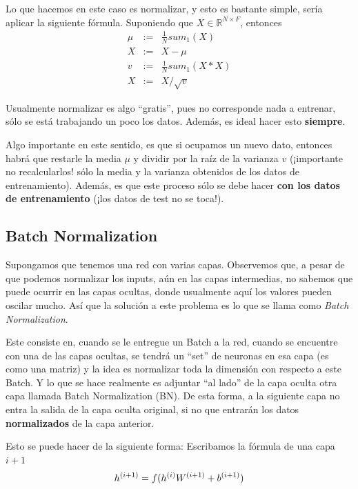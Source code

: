 Lo que hacemos en este caso es normalizar, y esto es bastante simple, sería aplicar la siguiente fórmula. Suponiendo que $X \in \mathbb{R}^{N \times F}$, entonces
\begin{eqnarray*}
    \mu &:=& \frac{1}{N} sum_1(X)\\
    X &:=& X - \mu \\
    v &:=& \frac{1}{N} sum_1 (X \ast X)\\
    X &:=& X / \sqrt{v}
\end{eqnarray*}

Usualmente normalizar es algo ``gratis'', pues no corresponde nada a entrenar, sólo se está trabajando un poco los datos. Además, es ideal hacer esto \textbf{siempre}. 

Algo importante en este sentido, es que si ocupamos un nuevo dato, entonces habrá que restarle la media $\mu$ y dividir por la raíz de la varianza $v$ (¡importante no recalcularlos! sólo la media y la varianza obtenidos de los datos de entrenamiento). Además, es que este proceso sólo se debe hacer \textbf{con los datos de entrenamiento} (¡los datos de test no se toca!). 

\subsection{Batch Normalization}

Supongamos que tenemos una red con varias capas. Observemos que, a pesar de que podemos normalizar los inputs, aún en las capas intermedias, no sabemos que puede ocurrir en las capas ocultas, donde usualmente aquí los valores pueden oscilar mucho. Así que la solución a este problema es lo que se llama como \textit{Batch Normalization}.

Este consiste en, cuando se le entregue un Batch a la red, cuando se encuentre con una de las capas ocultas, se tendrá un ``set'' de neuronas en esa capa (es como una matriz) y la idea es normalizar toda la dimensión con respecto a este Batch. Y lo que se hace realmente es adjuntar ``al lado'' de la capa oculta otra capa llamada Batch Normalization (BN). De esta forma, a la siguiente capa no entra la salida de la capa oculta original, si no que entrarán los datos \textbf{normalizados} de la capa anterior.


Esto se puede hacer de la siguiente forma: Escribamos la fórmula de una capa $i+1$
\begin{eqnarray}
h\entr[i+1] = f(h\entr W\entr[i+1] + b\entr[i+1])
\end{eqnarray}

